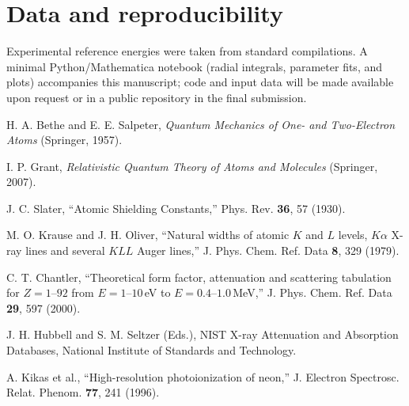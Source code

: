 \documentclass[12pt]{article}
\begin{document}
\section*{Data and reproducibility}
Experimental reference energies were taken from standard compilations.\cite{NISTXray,Chantler} A minimal Python/Mathematica notebook (radial integrals, parameter fits, and plots) accompanies this manuscript; code and input data will be made available upon request or in a public repository in the final submission.


\begin{thebibliography}{99}

H. A. Bethe and E. E. Salpeter, \emph{Quantum Mechanics of One- and Two-Electron Atoms} (Springer, 1957).

I. P. Grant, \emph{Relativistic Quantum Theory of Atoms and Molecules} (Springer, 2007).

J. C. Slater, ``Atomic Shielding Constants,'' Phys. Rev. \textbf{36}, 57 (1930).

M. O. Krause and J. H. Oliver, ``Natural widths of atomic $K$ and $L$ levels, $K\alpha$ X-ray lines and several $KLL$ Auger lines,'' J. Phys. Chem. Ref. Data \textbf{8}, 329 (1979).

C. T. Chantler, ``Theoretical form factor, attenuation and scattering tabulation for $Z=1$--$92$ from $E=1$--$10$\,eV to $E=0.4$--$1.0$\,MeV,'' J. Phys. Chem. Ref. Data \textbf{29}, 597 (2000).

J. H. Hubbell and S. M. Seltzer (Eds.), NIST X-ray Attenuation and Absorption Databases, National Institute of Standards and Technology.

A. Kikas et al., ``High-resolution photoionization of neon,'' J. Electron Spectrosc. Relat. Phenom. \textbf{77}, 241 (1996).

\end{thebibliography}
\end{document}
